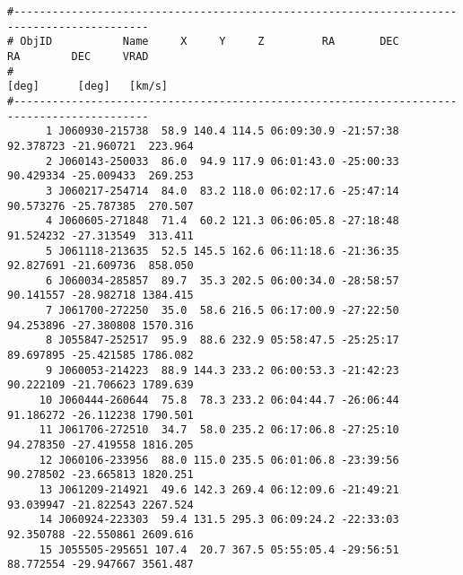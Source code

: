 {\scriptsize
\begin{verbatim}
#-------------------------------------------------------------------------------------------
# ObjID           Name     X     Y     Z         RA       DEC         RA        DEC     VRAD
#                                                                  [deg]      [deg]   [km/s]
#-------------------------------------------------------------------------------------------
      1 J060930-215738  58.9 140.4 114.5 06:09:30.9 -21:57:38  92.378723 -21.960721  223.964
      2 J060143-250033  86.0  94.9 117.9 06:01:43.0 -25:00:33  90.429334 -25.009433  269.253
      3 J060217-254714  84.0  83.2 118.0 06:02:17.6 -25:47:14  90.573276 -25.787385  270.507
      4 J060605-271848  71.4  60.2 121.3 06:06:05.8 -27:18:48  91.524232 -27.313549  313.411
      5 J061118-213635  52.5 145.5 162.6 06:11:18.6 -21:36:35  92.827691 -21.609736  858.050
      6 J060034-285857  89.7  35.3 202.5 06:00:34.0 -28:58:57  90.141557 -28.982718 1384.415
      7 J061700-272250  35.0  58.6 216.5 06:17:00.9 -27:22:50  94.253896 -27.380808 1570.316
      8 J055847-252517  95.9  88.6 232.9 05:58:47.5 -25:25:17  89.697895 -25.421585 1786.082
      9 J060053-214223  88.9 144.3 233.2 06:00:53.3 -21:42:23  90.222109 -21.706623 1789.639
     10 J060444-260644  75.8  78.3 233.2 06:04:44.7 -26:06:44  91.186272 -26.112238 1790.501
     11 J061706-272510  34.7  58.0 235.2 06:17:06.8 -27:25:10  94.278350 -27.419558 1816.205
     12 J060106-233956  88.0 115.0 235.5 06:01:06.8 -23:39:56  90.278502 -23.665813 1820.251
     13 J061209-214921  49.6 142.3 269.4 06:12:09.6 -21:49:21  93.039947 -21.822543 2267.524
     14 J060924-223303  59.4 131.5 295.3 06:09:24.2 -22:33:03  92.350788 -22.550861 2609.616
     15 J055505-295651 107.4  20.7 367.5 05:55:05.4 -29:56:51  88.772554 -29.947667 3561.487


\end{verbatim}}
